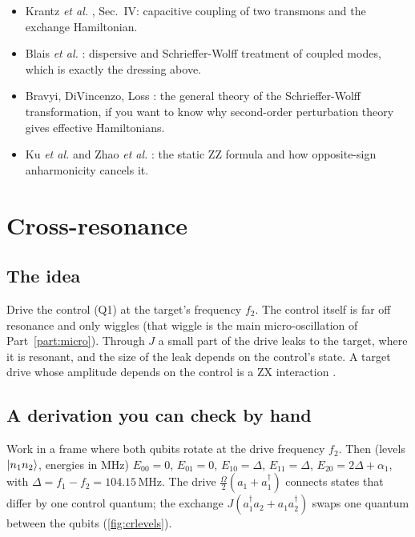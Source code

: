 \documentclass[11pt,a4paper]{article}
\newcommand{\ad}{a^{\dagger}}
\newcommand{\MHz}{\,\mathrm{MHz}}
\begin{document}
\begin{readbox}
\begin{itemize}
\item Krantz \emph{et al.} \cite{krantz2019}, Sec.~IV: capacitive coupling of two transmons and the exchange
  Hamiltonian.
\item Blais \emph{et al.} \cite{blais2021}: dispersive and Schrieffer-Wolff treatment of coupled modes, which is
  exactly the dressing above.
\item Bravyi, DiVincenzo, Loss \cite{bravyi2011}: the general theory of the Schrieffer-Wolff transformation, if you
  want to know why second-order perturbation theory gives effective Hamiltonians.
\item Ku \emph{et al.} \cite{ku2020} and Zhao \emph{et al.} \cite{zhao2020}: the static ZZ formula and how
  opposite-sign anharmonicity cancels it.
\end{itemize}
\end{readbox}

\section{Cross-resonance}\label{sec:cr}

\subsection{The idea}

Drive the control (Q1) at the target's frequency \(f_2\). The control itself is far off resonance and only wiggles
(that wiggle is the main micro-oscillation of Part~\ref{part:micro}). Through \(J\) a small part of the drive leaks to
the target, where it is resonant, and the size of the leak depends on the control's state. A target drive whose
amplitude depends on the control is a ZX interaction \cite{rigetti2010,chow2011}.

\subsection{A derivation you can check by hand}

Work in a frame where both qubits rotate at the drive frequency \(f_2\). Then (levels \(\ket{n_1 n_2}\), energies in MHz)
\(E_{00} = 0\), \(E_{01} = 0\), \(E_{10} = \Delta\), \(E_{11} = \Delta\), \(E_{20} = 2\Delta + \alpha_1\), with
\(\Delta = f_1 - f_2 = 104.15\MHz\). The drive \(\tfrac{\Omega}{2}(a_1+\ad_1)\) connects states that differ by one
control quantum; the exchange \(J(\ad_1a_2+a_1\ad_2)\) swaps one quantum between the qubits (\cref{fig:crlevels}).
\end{document}
